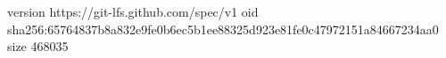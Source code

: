 version https://git-lfs.github.com/spec/v1
oid sha256:65764837b8a832e9fe0b6ec5b1ee88325d923e81fe0c47972151a84667234aa0
size 468035

